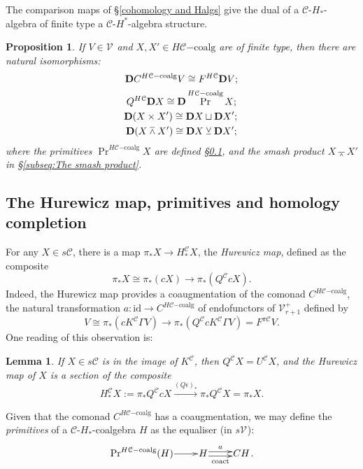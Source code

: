 \documentclass[11pt]{amsart} \renewcommand{\baselinestretch}{1.2}
\theoremstyle{plain}
\newtheorem{lem}[thm]{Lemma}
\newtheorem{prop}[thm]{Proposition}
\numberwithin{equation}{section} %
\theoremstyle{plain}
\newtheorem{lem}[thm]{Lemma}
\newtheorem{prop}[thm]{Proposition}
\numberwithin{equation}{chapter} %
\DeclareMathOperator{\Prim}{Pr}
\renewcommand{\to}{\longrightarrow}
\newcommand{\calV}{\mathcal{V}}
\newcommand{\calc}{\mathcal{C}}
\newcommand{\vect}[2]{\calV^{#1}_{#2}}
\newcommand{\PA}[1]{\pi#1}
\newcommand{\HA}[1]{H#1}
\newcommand{\HC}[1]{H#1\mathrm{-coalg}}
\newcommand{\Id}{\mathrm{id}}
\newcommand{\dual}{\mathbf{D}}
\newcommand{\smashprod}{\barwedge}%
\newcommand{\smashcoprod}{\veebar}%
\newcommand{\SubsectionOrSection}[1]{\subsection{#1}}
\begin{document}
\begin{Pi-algebras and cohomology algebras}
The comparison maps of \S\ref{cohomology and Halgs} give the dual of a $\calc$-$H_*$-algebra of finite type a $\calc$-$H^*$-algebra structure. 
\begin{prop}
\label{something about dualization}
If $V\in \vect{}{}$ and $X,X'\in \HC{\calc}$ are of finite type, then there are natural isomorphisms:
\begin{gather*}
\dual C^{\HC{\calc}}V\cong F^{\HA{\calc}}\dual V;\\
Q^{\HA{\calc}}\dual X\cong \dual \Prim^{\HC{\calc}} X;\\
\dual(X\times X')\cong \dual X\sqcup \dual X';\makebox[0cm][l]{}\\
\dual(X\smashprod X')\cong \dual X\smashcoprod \dual X';
\end{gather*}
where the primitives $\Prim^{\HC{\calc}}X$ are defined \S\ref{The Hurewicz map, primitives and homology completion}, and the smash product $X\smashprod X'$ in \S\ref{subseq:The smash product}.
\end{prop}
\SubsectionOrSection{The Hurewicz map, primitives and homology completion}
\label{The Hurewicz map, primitives and homology completion}
For any $X\in s\calc$, there is a map $\pi_*X\to H_*^{\calc}X$, the \emph{Hurewicz map}, defined as the composite
\[\pi_*X\cong \pi_*(cX)\to \pi_*(Q^{\calc}cX).\]
Indeed, the Hurewicz map provides a coaugmentation of the comonad $C^{\HC{\calc}}$, the natural transformation $a:\Id\to C^{\HC{\calc}}$ of endofunctors of $\vect{+}{r+1}$ defined by
\[V\cong \pi_*(cK^{\calc}\Gamma  V)\to \pi_*(Q^{\calc}cK^{\calc}\Gamma  V)=F^{\PA{\calc}}V.\]
One reading of this observation is:
\begin{lem}
\label{hurewicz is a section}
If $X\in s\calc$ is in the image of $K^\calc$, then $Q^\calc X=U^{\calc}X$, and the Hurewicz map of $X$ is a section of the composite
\[H_*^{\calc}X:=\pi_*Q^{\calc}cX\overset{(Q\epsilon)_*}{\to}\pi_*Q^{\calc}X=\pi_*X.\]
\end{lem}
Given that the comonad $C^{\HC{\calc}}$ has a coaugmentation, we may define the \emph{primitives} of a $\calc$-$H_*$-coalgebra $H$ as the equaliser (in $s\vect{}{}$):
\[\xymatrix@R=4mm@1{
\Prim^{\HC{\calc}}(H)\ar[r]
&%
H\ar@<.5ex>[r]^-{a}
\ar@<-.5ex>[r]_-{\textup{coact}}
&%
CH%
}.\]

\end{Pi-algebras and cohomology algebras}
\end{document}
